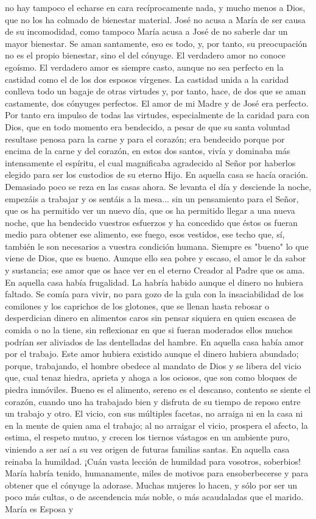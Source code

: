 \documentclass[12pt]{book} %
\begin{document}
no hay tampoco el echarse en cara recíprocamente nada, y mucho menos a Dios, que no los ha colmado de bienestar material. José no acusa a María de ser causa de su incomodidad, como tampoco María acusa a José de no saberle dar un mayor bienestar. Se aman santamente, eso es todo, y, por tanto, su preocupación no es el propio bienestar, sino el del cónyuge. El verdadero amor no conoce egoísmo. El verdadero amor es siempre casto, aunque no sea perfecto en la castidad como el de los dos esposos vírgenes. La castidad unida a la caridad conlleva todo un bagaje de otras virtudes y, por tanto, hace, de dos que se aman castamente, dos cónyuges perfectos. El amor de mi Madre y de José era perfecto. Por tanto era impulso de todas las virtudes, especialmente de la caridad para con Dios, que en todo momento era bendecido, a pesar de que su santa voluntad resultase penosa para la carne y para el corazón; era bendecido porque por encima de la carne y del corazón, en estos dos santos, vivía y dominaba más intensamente el espíritu, el cual magnificaba agradecido al Señor por haberlos elegido para ser los custodios de su eterno Hijo. En aquella casa se hacía oración. Demasiado poco se reza en las casas ahora. Se levanta el día y desciende la noche, empezáis a trabajar y os sentáis a la mesa... sin un pensamiento para el Señor, que os ha permitido ver un nuevo día, que os ha permitido llegar a una nueva noche, que ha bendecido vuestros esfuerzos y ha concedido que éstos os fueran medio para obtener ese alimento, ese fuego, esos vestidos, ese techo que, sí, también le son necesarios a vuestra condición humana. Siempre es "bueno" lo que viene de Dios, que es bueno. Aunque ello sea pobre y escaso, el amor le da sabor y sustancia; ese amor que os hace ver en el eterno Creador al Padre que os ama. En aquella casa había frugalidad. La habría habido aunque el dinero no hubiera faltado. Se comía para vivir, no para gozo de la gula con la insaciabilidad de los comilones y los caprichos de los glotones, que se llenan hasta rebosar o desperdician dinero en alimentos caros sin pensar siquiera en quien escasea de comida o no la tiene, sin reflexionar en que si fueran moderados ellos muchos podrían ser aliviados de las dentelladas del hambre. En aquella casa había amor por el trabajo. Este amor hubiera existido aunque el dinero hubiera abundado; porque, trabajando, el hombre obedece al mandato de Dios y se libera del vicio que, cual tenaz hiedra, aprieta y ahoga a los ociosos, que son como bloques de piedra inmóviles. Bueno es el alimento, sereno es el descanso, contento se siente el corazón, cuando uno ha trabajado bien y disfruta de su tiempo de reposo entre un trabajo y otro. El vicio, con sus múltiples facetas, no arraiga ni en la casa ni en la mente de quien ama el trabajo; al no arraigar el vicio, prospera el afecto, la estima, el respeto mutuo, y crecen los tiernos vástagos en un ambiente puro, viniendo a ser así a su vez origen de futuras familias santas. En aquella casa reinaba la humildad. ¡Cuán vasta lección de humildad para vosotros, soberbios! María habría tenido, humanamente, miles de motivos para ensoberbecerse y para obtener que el cónyuge la adorase. Muchas mujeres lo hacen, y sólo por ser un poco más cultas, o de ascendencia más noble, o más acaudaladas que el marido. María es Esposa y 
\end{document}
